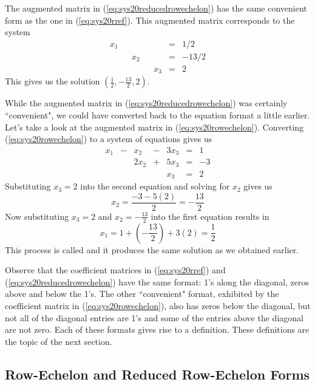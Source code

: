 \documentclass{ximera}
\begin{document}
\begin{exploration}
The augmented matrix in (\ref{eq:sys20reducedrowechelon}) has the same convenient form as the one in (\ref{eq:sys20rref}).  This augmented matrix corresponds to the system
\begin{equation*}
    \begin{array}{ccccccc}
      x_1 & &&&&= &1/2 \\
   & &x_2&&&=&-13/2\\
   & &&&x_3&=&2
        \end{array}
    \end{equation*}
This gives us the solution $(\frac{1}{2}, -\frac{13}{2}, 2)$.

While the augmented matrix in (\ref{eq:sys20reducedrowechelon}) was certainly ``convenient", we could have converted back to the equation format a little earlier.  Let's take a look at the augmented matrix in (\ref{eq:sys20rowechelon}).  Converting (\ref{eq:sys20rowechelon}) to a system of equations gives us
\begin{equation*}
    \begin{array}{ccccccc}
      x_1 &- &x_2&-&3x_3&= &1\\
   & &2x_2&+&5x_3&=&-3\\
   & &&&x_3&=&2
        \end{array}
    \end{equation*}
Substituting $x_3=2$ into the second equation and solving for $x_2$ gives us $$x_2=\frac{-3-5(2)}{2}=-\frac{13}{2}$$  Now substituting $x_3=2$ and $x_2=-\frac{13}{2}$ into the first equation results in $$x_1=1+\left(-\frac{13}{2}\right)+3(2)=\frac{1}{2}$$  This process is called  and it produces the same solution as we obtained earlier.
\end{exploration}

Observe that the coefficient matrices in (\ref{eq:sys20rref}) and (\ref{eq:sys20reducedrowechelon}) have the same format: 1's along the diagonal, zeros above and below the 1's.  The other ``convenient" format, exhibited by the coefficient matrix in (\ref{eq:sys20rowechelon}),  also has zeros below the diagonal, but not all of the diagonal entries are 1's and some of the entries above the diagonal are not zero.  Each of these formats gives rise to a definition.  These definitions are the topic of the next section.


\subsection*{Row-Echelon and Reduced Row-Echelon Forms}
\end{document}
